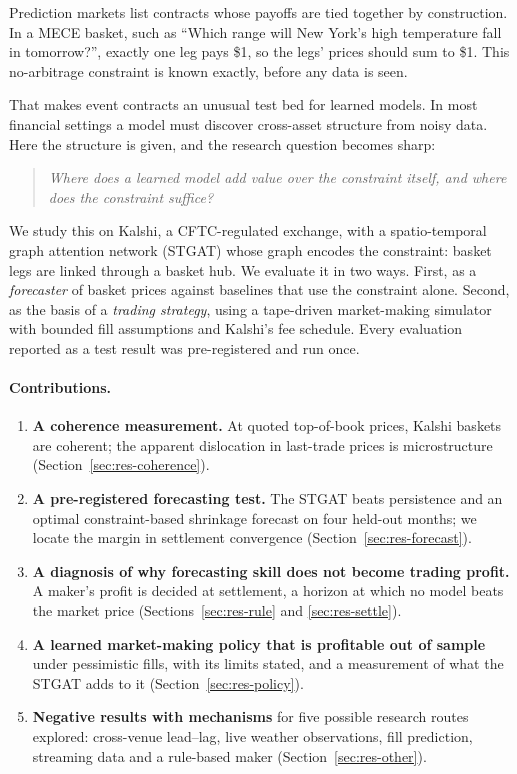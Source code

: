 \documentclass[11pt,a4paper]{article}
\begin{document}
Prediction markets list contracts whose payoffs are tied together by construction. In a MECE basket, such as
``Which range will New York's high temperature fall in tomorrow?'', exactly one leg pays \$1, so the legs' prices
should sum to \$1. This no-arbitrage constraint is known exactly, before any data is seen.

That makes event contracts an unusual test bed for learned models. In most financial settings a model must discover
cross-asset structure from noisy data. Here the structure is given, and the research question becomes sharp:
\begin{quote}
\emph{Where does a learned model add value over the constraint itself, and where does the constraint suffice?}
\end{quote}

We study this on Kalshi, a CFTC-regulated exchange, with a spatio-temporal graph attention network (STGAT) whose
graph encodes the constraint: basket legs are linked through a basket hub. We evaluate it in two ways. First, as a
\emph{forecaster} of basket prices against baselines that use the constraint alone. Second, as the basis of a
\emph{trading strategy}, using a tape-driven market-making simulator with bounded fill assumptions and Kalshi's fee
schedule. Every evaluation reported as a test result was pre-registered and run once.

\paragraph{Contributions.}
\begin{enumerate}
  \item \textbf{A coherence measurement.} At quoted top-of-book prices, Kalshi baskets are coherent; the apparent
    dislocation in last-trade prices is microstructure (Section~\ref{sec:res-coherence}).
  \item \textbf{A pre-registered forecasting test.} The STGAT beats persistence and an optimal constraint-based
    shrinkage forecast on four held-out months; we locate the margin in settlement convergence
    (Section~\ref{sec:res-forecast}).
  \item \textbf{A diagnosis of why forecasting skill does not become trading profit.} A maker's profit is decided at
    settlement, a horizon at which no model beats the market price (Sections~\ref{sec:res-rule} and
    \ref{sec:res-settle}).
  \item \textbf{A learned market-making policy that is profitable out of sample} under pessimistic fills, with its
    limits stated, and a measurement of what the STGAT adds to it (Section~\ref{sec:res-policy}).
  \item \textbf{Negative results with mechanisms} for five possible research routes explored: cross-venue lead--lag, live weather
    observations, fill prediction, streaming data and a rule-based maker (Section~\ref{sec:res-other}).
\end{enumerate}
\end{document}

